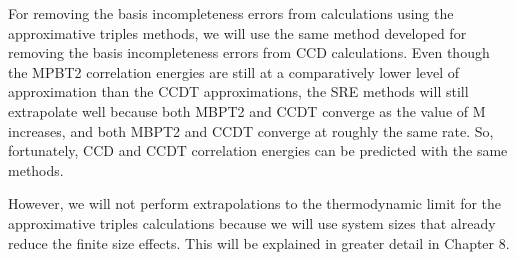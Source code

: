 For removing the basis incompleteness errors from calculations using the approximative triples methods, we will use the same method developed for removing the basis incompleteness errors from CCD calculations.  Even though the MPBT2 correlation energies are still at a comparatively lower level of approximation than the CCDT approximations, the SRE methods will still extrapolate well because both MBPT2 and CCDT converge as the value of M increases, and both MBPT2 and CCDT converge at roughly the same rate.  So, fortunately, CCD and CCDT correlation energies can be predicted with the same methods.

However, we will not perform extrapolations to the thermodynamic limit for the approximative triples calculations because we will use system sizes that already reduce the finite size effects.  This will be explained in greater detail in Chapter 8.